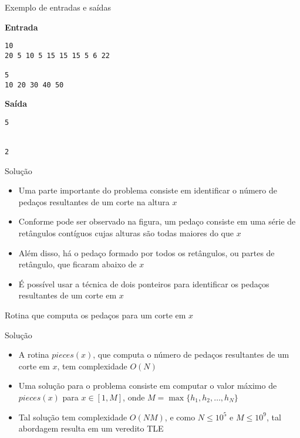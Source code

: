 \begin{frame}[fragile]{Exemplo de entradas e saídas}

\begin{minipage}[t]{0.45\textwidth}
\textbf{Entrada}
\begin{verbatim}
10
20 5 10 5 15 15 15 5 6 22

5
10 20 30 40 50
\end{verbatim}
\end{minipage}
\begin{minipage}[t]{0.5\textwidth}
\textbf{Saída}
\begin{verbatim}
5


2
\end{verbatim}
\end{minipage}
\end{frame}

\begin{frame}[fragile]{Solução}

    \begin{itemize}
        \item Uma parte importante do problema consiste em identificar o número de pedaços 
            resultantes de um corte na altura $x$

        \item Conforme pode ser observado na figura, um pedaço consiste em uma série de retângulos
            contíguos cujas alturas são todas maiores do que $x$

        \item Além disso, há o pedaço formado por todos os retângulos, ou partes de retângulo,
            que ficaram abaixo de $x$

        \item É possível usar a técnica de dois ponteiros para identificar os pedaços resultantes
            de um corte em $x$
    \end{itemize}

\end{frame}

\begin{frame}[fragile]{Rotina que computa os pedaços para um corte em $x$}
\end{frame}

\begin{frame}[fragile]{Solução}

    \begin{itemize}
        \item A rotina $pieces(x)$, que computa o número de pedaços resultantes de um corte em 
            $x$, tem complexidade $O(N)$

        \item Uma solução para o problema consiste em computar o valor máximo de $pieces(x)$
            para $x \in [1, M]$, onde $M = \max\{ h_1, h_2, \ldots,
            h_N\}$

        \item Tal solução tem complexidade $O(NM)$, e como $N\leq 10^5$ e $M\leq 10^9$, tal 
            abordagem resulta em um veredito TLE
    \end{itemize}

\end{frame}

